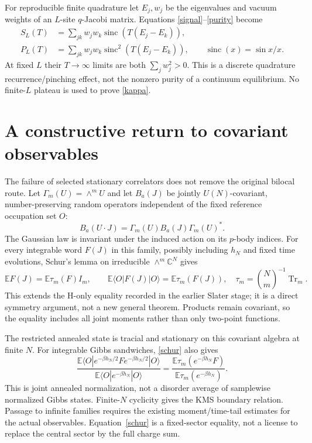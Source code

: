 \documentclass[11pt]{article}
\newcommand{\Tr}{\operatorname{Tr}}
\begin{document}
For reproducible finite quadrature let $E_j,w_j$ be the eigenvalues
and vacuum weights of an $L$-site $q$-Jacobi matrix. Equations
\eqref{signal}--\eqref{purity} become
\begin{align}
 S_L(T)&=\sum_{jk}w_jw_k\operatorname{sinc}(T(E_j-E_k)),\\
 P_L(T)&=\sum_{jk}w_jw_k\operatorname{sinc}^2(T(E_j-E_k)),
 \qquad \operatorname{sinc}(x)=\sin x/x.
\end{align}
At fixed $L$ their $T\to\infty$ limits are both $\sum_j w_j^2>0$.
This is a discrete quadrature recurrence/pinching effect, not
the nonzero purity of a continuum equilibrium. No finite-$L$
plateau is used to prove \eqref{kappa}.

\newpage
\section{A constructive return to covariant observables}
The failure of selected stationary correlators does not remove
the original bilocal route. Let $\Gamma_m(U)=\wedge^m U$ and let
$B_a(J)$ be jointly $U(N)$-covariant, number-preserving random
operators independent of the fixed reference occupation set $O$:
\begin{equation}
 B_a(U\cdot J)=\Gamma_m(U)B_a(J)\Gamma_m(U)^*.
\end{equation}
The Gaussian law is invariant under the induced action on its
$p$-body indices. For every integrable word $F(J)$ in this family,
possibly including $h_N$ and fixed time evolutions, Schur's lemma
on irreducible $\wedge^m\mathbb C^N$ gives
\begin{equation}\label{schur}
 \mathbb E F(J)=\mathbb E\tau_m(F) I_m,\qquad
 \mathbb E\langle O|F(J)|O\rangle=\mathbb E\tau_m(F(J)),
 \quad \tau_m=\binom Nm^{-1}\Tr_m.
\end{equation}
This extends the H-only equality recorded in the earlier Slater
stage; it is a direct symmetry argument, not a new general theorem.
Products remain covariant, so the equality includes all joint
moments rather than only two-point functions.

The restricted annealed state is tracial and stationary on this
covariant algebra at finite $N$. For integrable Gibbs sandwiches,
\eqref{schur} also gives
\begin{equation}\label{gibbs}
 \frac{\mathbb E\langle O|e^{-\beta h_N/2}F
                           e^{-\beta h_N/2}|O\rangle}
      {\mathbb E\langle O|e^{-\beta h_N}|O\rangle}
 =\frac{\mathbb E\tau_m(e^{-\beta h_N}F)}
             {\mathbb E\tau_m(e^{-\beta h_N})}.
\end{equation}
This is joint annealed normalization, not a disorder average of
samplewise normalized Gibbs states. Finite-$N$ cyclicity gives
the KMS boundary relation. Passage to infinite families requires
the existing moment/time-tail estimates for the actual observables.
Equation~\eqref{schur} is a fixed-sector equality, not a license
to replace the central sector by the full charge sum.
\end{document}
